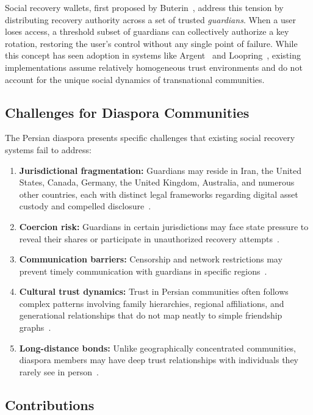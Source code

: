 \documentclass[11pt,a4paper,twocolumn]{article}
\begin{document}
Social recovery wallets, first proposed by Buterin~\cite{buterin2021social}, address this tension by distributing recovery authority across a set of trusted \emph{guardians}. When a user loses access, a threshold subset of guardians can collectively authorize a key rotation, restoring the user's control without any single point of failure. While this concept has seen adoption in systems like Argent~\cite{argent2020} and Loopring~\cite{loopring2021}, existing implementations assume relatively homogeneous trust environments and do not account for the unique social dynamics of transnational communities.

\subsection{Challenges for Diaspora Communities}

The Persian diaspora presents specific challenges that existing social recovery systems fail to address:

\begin{enumerate}[label=(\roman*)]
  \item \textbf{Jurisdictional fragmentation:} Guardians may reside in Iran, the United States, Canada, Germany, the United Kingdom, Australia, and numerous other countries, each with distinct legal frameworks regarding digital asset custody and compelled disclosure~\cite{tse2019crossborder}.
  \item \textbf{Coercion risk:} Guardians in certain jurisdictions may face state pressure to reveal their shares or participate in unauthorized recovery attempts~\cite{amnesty2023iran}.
  \item \textbf{Communication barriers:} Censorship and network restrictions may prevent timely communication with guardians in specific regions~\cite{anderson2012censorship}.
  \item \textbf{Cultural trust dynamics:} Trust in Persian communities often follows complex patterns involving family hierarchies, regional affiliations, and generational relationships that do not map neatly to simple friendship graphs~\cite{beeman1986persian}.
  \item \textbf{Long-distance bonds:} Unlike geographically concentrated communities, diaspora members may have deep trust relationships with individuals they rarely see in person~\cite{diminescu2008connected}.
\end{enumerate}

\subsection{Contributions}
\end{document}
